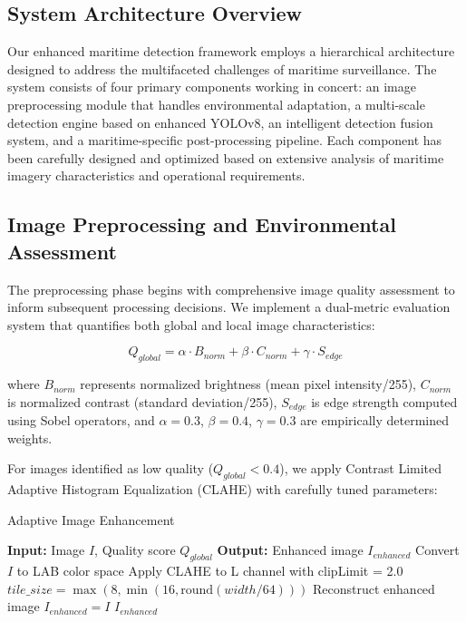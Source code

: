 \documentclass[10pt]{article}
\begin{document}
\subsection{System Architecture Overview}

Our enhanced maritime detection framework employs a hierarchical architecture designed to address the multifaceted challenges of maritime surveillance. The system consists of four primary components working in concert: an image preprocessing module that handles environmental adaptation, a multi-scale detection engine based on enhanced YOLOv8, an intelligent detection fusion system, and a maritime-specific post-processing pipeline. Each component has been carefully designed and optimized based on extensive analysis of maritime imagery characteristics and operational requirements.

\subsection{Image Preprocessing and Environmental Assessment}

The preprocessing phase begins with comprehensive image quality assessment to inform subsequent processing decisions. We implement a dual-metric evaluation system that quantifies both global and local image characteristics:

\begin{equation}
Q_{global} = \alpha \cdot B_{norm} + \beta \cdot C_{norm} + \gamma \cdot S_{edge}
\end{equation}

where $B_{norm}$ represents normalized brightness (mean pixel intensity/255), $C_{norm}$ is normalized contrast (standard deviation/255), $S_{edge}$ is edge strength computed using Sobel operators, and $\alpha = 0.3$, $\beta = 0.4$, $\gamma = 0.3$ are empirically determined weights.

For images identified as low quality ($Q_{global} < 0.4$), we apply Contrast Limited Adaptive Histogram Equalization (CLAHE) with carefully tuned parameters:

\begin{algorithm}
\caption{Adaptive Image Enhancement}
\begin{algorithmic}
\STATE \textbf{Input:} Image $I$, Quality score $Q_{global}$
\STATE \textbf{Output:} Enhanced image $I_{enhanced}$
    \STATE Convert $I$ to LAB color space
    \STATE Apply CLAHE to L channel with clipLimit = 2.0
    \STATE $tile\_size = \max(8, \min(16, \text{round}(width/64)))$
    \STATE Reconstruct enhanced image
\ELSE
    \STATE $I_{enhanced} = I$
\ENDIF
\RETURN $I_{enhanced}$
\end{algorithmic}
\end{algorithm}
\end{document}
